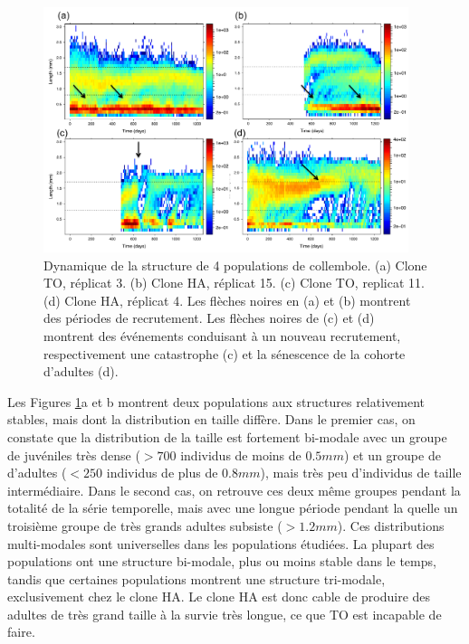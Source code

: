 \begin{figure}[!ht]
\begin{center}
\includegraphics[width=0.95\textwidth]{1_CorpsDeThese/Resumes/Fig/SP01}
\caption[Dynamiques de la
structure de 4 populations]{Dynamique de la structure de 4 populations de
collembole. (a) Clone TO, réplicat 3. (b) Clone HA, réplicat 15. (c) Clone TO,
replicat 11. (d) Clone HA, réplicat 4. Les flèches noires en (a) et (b) montrent
des périodes de recrutement. Les flèches noires de (c) et (d) montrent des
événements conduisant à un nouveau recrutement, respectivement une catastrophe
(c) et la sénescence de la cohorte d'adultes (d).}
\label{fig:SP1}
\end{center}
\end{figure}

Les Figures \ref{fig:SP1}a et b montrent deux populations aux structures
relativement stables, mais dont la distribution en taille diffère. Dans le
premier cas, on constate que la distribution de la taille est fortement
bi-modale avec un groupe de juvéniles très dense ($>700$ individus de moins de
$0.5mm$) et un groupe de d'adultes ($<250$ individus de plus de $0.8mm$), mais
très peu d'individus de taille intermédiaire. Dans le second cas, on retrouve
ces deux même groupes pendant la totalité de la série temporelle, mais avec une
longue période pendant la quelle un troisième groupe de très grands adultes
subsiste ($>1.2mm$). Ces distributions multi-modales sont universelles dans les
populations étudiées. La plupart des populations ont une structure bi-modale,
plus ou moins stable dans le temps, tandis que certaines populations montrent
une structure tri-modale, exclusivement chez le clone HA. Le clone HA est donc
cable de produire des adultes de très grand taille à la survie très longue, ce
que TO est incapable de faire.

